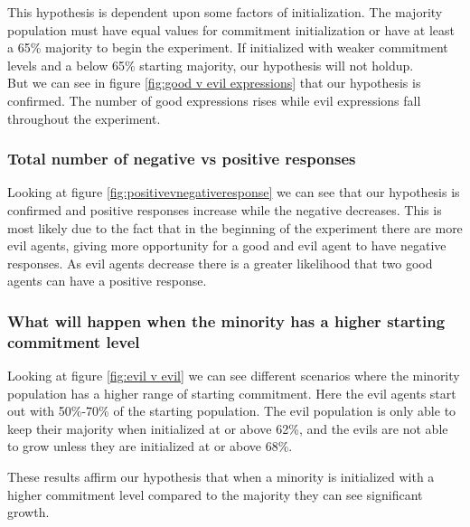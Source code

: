 \documentclass[]{article}
\begin{document}
This hypothesis is dependent upon some factors of initialization. The majority population must have equal values for commitment initialization or have at least a 65\% majority to begin the experiment. If initialized with weaker commitment levels and a below 65\% starting majority, our hypothesis will not holdup.\\
But we can see in figure \ref{fig:good v evil expressions} that our hypothesis is confirmed. The number of good expressions rises while evil expressions fall throughout the experiment.


\subsubsection{Total number of negative vs positive responses} 

Looking at figure \ref{fig:positivevnegativeresponse} we can see that our hypothesis is confirmed and positive responses increase while the negative  decreases. This is most likely due to the fact that in the beginning of the experiment there are more evil agents, giving more opportunity for a good and evil agent to have negative responses. As evil agents decrease there is a greater likelihood that two good agents can have a positive response. 


\subsubsection{What will happen when the minority has a higher starting commitment level}

Looking at figure \ref{fig:evil v evil} we can see different scenarios where the minority population has a higher range of starting commitment. Here the evil agents start out with 50\%-70\% of the starting population. The evil population is only able to keep their majority when initialized at or above 62\%, and the evils are not able to grow unless they are initialized at or above 68\%. 

These results affirm our hypothesis that when a minority is initialized with a higher commitment level compared to the majority they can see significant growth.
\end{document}
